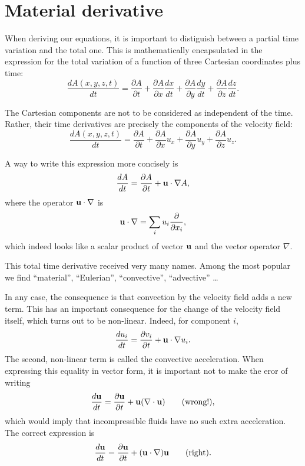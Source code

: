 \section{Material derivative}

When deriving our equations, it is important to distiguish between
a partial time variation and the total one. This is mathematically
encapsulated in the expression for the total variation of a function
of three Cartesian coordinates plus time:
\[
\frac{d A(x,y,z,t) }{dt} =
\frac{\partial A }{\partial t} +
\frac{\partial A }{\partial x} \frac{dx }{dt} +
\frac{\partial A }{\partial y} \frac{dy }{dt} +
\frac{\partial A }{\partial z} \frac{dz }{dt} .
\]


The Cartesian components are not to be considered as independent of
the time. Rather, their time derivatives are precisely the components
of the velocity field:
\[
\frac{d A(x,y,z,t) }{dt} =
\frac{\partial A }{\partial t} +
\frac{\partial A }{\partial x} u_x +
\frac{\partial A }{\partial y} u_y +
\frac{\partial A }{\partial z} u_z .
\]

A way to write this expression more concisely is
\[
\frac{d A }{dt} =
\frac{\partial A }{\partial t} +
\mathbf{u} \cdot \nabla A ,
\]
where the operator $\mathbf{u} \cdot \nabla$ is
\[
\mathbf{u} \cdot \nabla  =
\sum_i u_i \frac{\partial  }{\partial x_i} ,
\]
which indeed looks like a scalar product of vector $\mathbf{u}$ and the
vector operator $\nabla$.

This total time derivative received very many names. Among the most
popular we find ``material'', ``Eulerian'', ``convective'',
``advective''  \ldots

In any case, the consequence is that convection by the velocity field
adds a new term. This has an important consequence for the change
of the velocity field itself, which turns out to be non-linear. Indeed,
for component $i$,
\[
\frac{d u_i }{dt} =
\frac{\partial v_i }{\partial t} +
\mathbf{u} \cdot \nabla u_i .
\]
The second, non-linear term is called the convective
acceleration. When expressing this
equality in vector form, it is important not to make the eror of
writing
\[
\frac{d \mathbf{u}  }{dt} =
\frac{\partial \mathbf{u} }{\partial t} +
\mathbf{u}  ( \nabla \cdot \mathbf{u} ) \qquad \text{(wrong!)} ,
\]
which would imply that incompressible fluids have no such extra
acceleration. The correct expression is
\[
\frac{d \mathbf{u}  }{dt} =
\frac{\partial \mathbf{u} }{\partial t} +
(\mathbf{u} \cdot  \nabla ) \mathbf{u}  \qquad \text{(right)} .
\]

